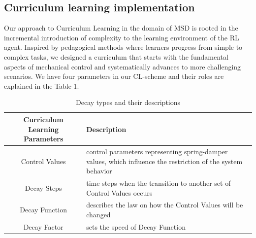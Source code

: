 \subsection{Curriculum learning implementation} \label{Curriculum learning implementation}
Our approach to Curriculum Learning in the domain of MSD is rooted in the incremental introduction of complexity to the learning environment of the RL agent. Inspired by pedagogical methods where learners progress from simple to complex tasks, we designed a curriculum that starts with the fundamental aspects of mechanical control and systematically advances to more challenging scenarios.
We have four parameters in our CL-scheme and their roles are explained in the Table 1.
\begin{table}[ht]
\caption{Decay types and their descriptions}
\begin{tabular}{|c|p{5cm}|}
\hline
\textbf{Curriculum Learning Parameters} & \textbf{Description} \\ \hline
Control Values & control parameters representing spring-damper values, which influence the restriction of the system behavior\\ \hline
Decay Steps & time steps when the transition to another set of Control Values occurs\\ \hline
Decay Function & describes the law on how the Control Values will be changed\\ \hline
Decay Factor & sets the speed of Decay Function\\ \hline
\end{tabular}
\end{table}
